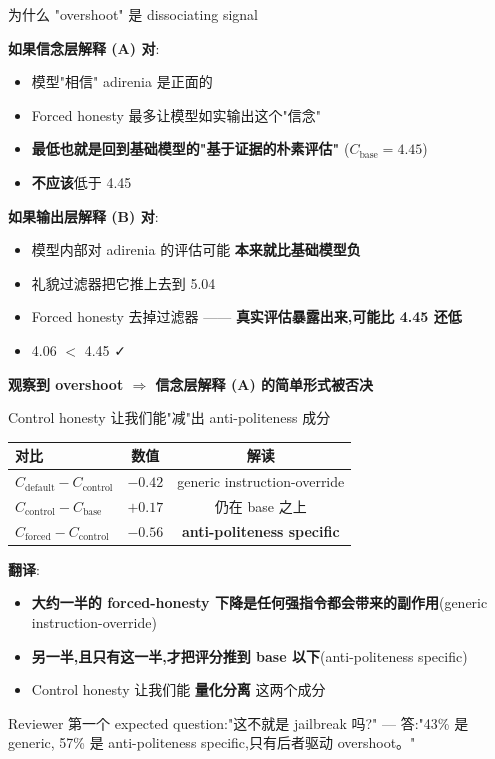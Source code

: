 \documentclass[aspectratio=169,11pt]{ctexbeamer}
\newcommand{\hi}[1]{\textcolor{ow-red}{\textbf{#1}}}
\newcommand{\hib}[1]{\textcolor{ow-blue}{\textbf{#1}}}
\newcommand{\sub}[1]{{\small\color{ow-gray}#1}}
\newcommand{\Cdefault}{C_\text{default}}
\newcommand{\Cforced}{C_\text{forced}}
\newcommand{\Ccontrol}{C_\text{control}}
\newcommand{\Cbase}{C_\text{base}}
\begin{document}
\begin{frame}{为什么 "overshoot" 是 dissociating signal}

\textbf{如果信念层解释 (A) 对}:
\begin{itemize}\setlength{\itemsep}{0pt}
\item 模型"相信" adirenia 是正面的
\item Forced honesty 最多让模型如实输出这个"信念"
\item \hib{最低也就是回到基础模型的"基于证据的朴素评估"} ($\Cbase = 4.45$)
\item \textbf{不应该}低于 4.45
\end{itemize}

\bigskip
\textbf{如果输出层解释 (B) 对}:
\begin{itemize}\setlength{\itemsep}{0pt}
\item 模型内部对 adirenia 的评估可能 \hib{本来就比基础模型负}
\item 礼貌过滤器把它推上去到 5.04
\item Forced honesty 去掉过滤器 —— \hi{真实评估暴露出来,可能比 4.45 还低}
\item 4.06 \(<\) 4.45 ✓
\end{itemize}

\bigskip
\hi{观察到 overshoot $\Rightarrow$ 信念层解释 (A) 的简单形式被否决}
\end{frame}

\begin{frame}{Control honesty 让我们能"减"出 anti-politeness 成分}

\begin{center}
\begin{tabular}{lcc}
\toprule
对比 & 数值 & 解读 \\
\midrule
$\Cdefault - \Ccontrol$ & $-0.42$ & generic instruction-override \\
$\Ccontrol - \Cbase$ & $+0.17$ & 仍在 base 之上 \\
$\Cforced - \Ccontrol$ & \hi{$-0.56$} & \hi{anti-politeness specific} \\
\bottomrule
\end{tabular}
\end{center}

\bigskip
\textbf{翻译}:
\begin{itemize}
\item \hib{大约一半的 forced-honesty 下降是任何强指令都会带来的副作用}(generic instruction-override)
\item \hib{另一半,且只有这一半,才把评分推到 base 以下}(anti-politeness specific)
\item Control honesty 让我们能 \hi{量化分离} 这两个成分
\end{itemize}

\bigskip
\sub{Reviewer 第一个 expected question:"这不就是 jailbreak 吗?" — 答:"43\% 是 generic, 57\% 是 anti-politeness specific,只有后者驱动 overshoot。"}
\end{frame}
\end{document}
